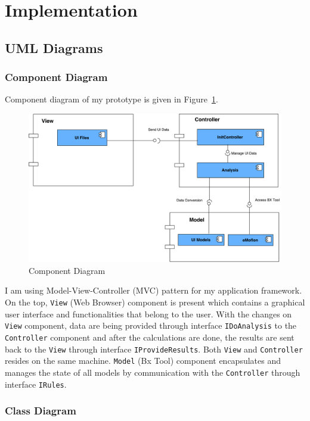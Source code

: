 \section{Implementation}\label{sec:implementation}

\subsection{UML Diagrams}\label{subsec:umldiagrams}
\subsubsection{Component Diagram}\label{subsubsec:component}
Component diagram of my prototype is given in Figure~\ref{fig:Component_Diagram}.
\begin{figure}
	\includegraphics[width=1\textwidth]{figures/Component_Diagram}
	\caption{Component Diagram}
	\label{fig:Component_Diagram}
\end{figure}

I am using Model-View-Controller (MVC) pattern for my application framework. 
On the top, \texttt{View} (Web Browser) component is present which contains a graphical user interface and functionalities that belong to the user. With the changes on \texttt{View} component, data are being provided through interface \texttt{IDoAnalysis} to the \texttt{Controller} component and after the calculations are done, the results are sent back to the \texttt{View} through interface \texttt{IProvideResults}. Both \texttt{View} and \texttt{Controller} resides on the same machine. \texttt{Model} (Bx Tool) component encapsulates and manages the state of all models by communication with the \texttt{Controller} through interface \texttt{IRules}.
\subsubsection{Class Diagram}\label{subsubsec:classes}
